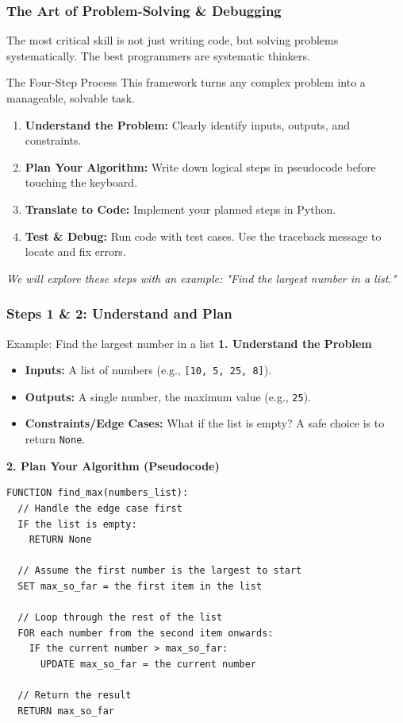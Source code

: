 \documentclass{beamer}
\begin{document}
\begin{frame}[fragile]
    \frametitle{The Art of Problem-Solving \& Debugging}
    The most critical skill is not just writing code, but solving problems systematically. The best programmers are systematic thinkers.
    \vspace{1em}

    \begin{block}{The Four-Step Process}
        This framework turns any complex problem into a manageable, solvable task.
        \begin{enumerate}
            \item \textbf{Understand the Problem:} Clearly identify inputs, outputs, and constraints.
            \item \textbf{Plan Your Algorithm:} Write down logical steps in pseudocode before touching the keyboard.
            \item \textbf{Translate to Code:} Implement your planned steps in Python.
            \item \textbf{Test \& Debug:} Run code with test cases. Use the traceback message to locate and fix errors.
        \end{enumerate}
    \end{block}

    \vspace{1em}
    \textit{We will explore these steps with an example: "Find the largest number in a list."}
\end{frame}

\begin{frame}[fragile]
    \frametitle{Steps 1 \& 2: Understand and Plan}
    \begin{block}{Example: Find the largest number in a list}
        \textbf{1. Understand the Problem}
        \begin{itemize}
            \item \textbf{Inputs:} A list of numbers (e.g., \texttt{[10, 5, 25, 8]}).
            \item \textbf{Outputs:} A single number, the maximum value (e.g., \texttt{25}).
            \item \textbf{Constraints/Edge Cases:} What if the list is empty? A safe choice is to return \texttt{None}.
        \end{itemize}
        \vspace{1em}
        \textbf{2. Plan Your Algorithm (Pseudocode)}
        \begin{lstlisting}[basicstyle=\ttfamily\scriptsize, frame=single]
FUNCTION find_max(numbers_list):
  // Handle the edge case first
  IF the list is empty:
    RETURN None

  // Assume the first number is the largest to start
  SET max_so_far = the first item in the list

  // Loop through the rest of the list
  FOR each number from the second item onwards:
    IF the current number > max_so_far:
      UPDATE max_so_far = the current number

  // Return the result
  RETURN max_so_far
        \end{lstlisting}
    \end{block}
\end{frame}
\end{document}
